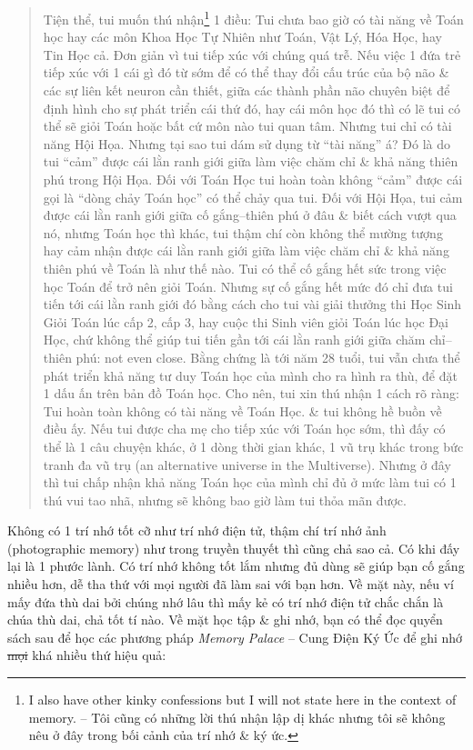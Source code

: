 \documentclass[12pt,oneside]{book}
\begin{document}
\begin{quote}
	Tiện thể, tui muốn thú nhận\footnote{I also have other kinky confessions but I will not state here in the context of memory. -- Tôi cũng có những lời thú nhận lập dị khác nhưng tôi sẽ không nêu ở đây trong bối cảnh của trí nhớ \& ký ức.} 1 điều: Tui chưa bao giờ có tài năng về Toán học hay các môn Khoa Học Tự Nhiên như Toán, Vật Lý, Hóa Học, hay Tin Học cả. Đơn giản vì tui tiếp xúc với chúng quá trễ. Nếu việc 1 đứa trẻ tiếp xúc với 1 cái gì đó từ sớm để có thể thay đổi cấu trúc của bộ não \& các sự liên kết neuron cần thiết, giữa các thành phần não chuyên biệt để định hình cho sự phát triển cái thứ đó, hay cái môn học đó thì có lẽ tui có thể sẽ giỏi Toán hoặc bất cứ môn nào tui quan tâm. Nhưng tui chỉ có tài năng Hội Họa. Nhưng tại sao tui dám sử dụng từ ``tài năng'' á? Đó là do tui ``cảm'' được cái lằn ranh giới giữa làm việc chăm chỉ \& khả năng thiên phú trong Hội Họa. Đối với Toán Học tui hoàn toàn không ``cảm'' được cái gọi là ``dòng chảy Toán học'' có thể chảy qua tui. Đối với Hội Họa, tui cảm được cái lằn ranh giới giữa cố gắng--thiên phú ở đâu \& biết cách vượt qua nó, nhưng Toán học thì khác, tui thậm chí còn không thể mường tượng hay cảm nhận được cái lằn ranh giới giữa làm việc chăm chỉ \& khả năng thiên phú về Toán là như thế nào. Tui có thể cố gắng hết sức trong việc học Toán để trở nên giỏi Toán. Nhưng sự cố gắng hết mức đó chỉ đưa tui tiến tới cái lằn ranh giới đó bằng cách cho tui vài giải thưởng thi Học Sinh Giỏi Toán lúc cấp 2, cấp 3, hay cuộc thi Sinh viên giỏi Toán lúc học Đại Học, chứ không thể giúp tui tiến gần tới cái lằn ranh giới giữa chăm chỉ--thiên phú: not even close. Bằng chứng là tới năm 28 tuổi, tui vẫn chưa thể phát triển khả năng tư duy Toán học của mình cho ra hình ra thù, để đặt 1 dấu ấn trên bản đồ Toán học. Cho nên, tui xin thú nhận 1 cách rõ ràng: Tui hoàn toàn không có tài năng về Toán Học. \& tui không hề buồn về điều ấy. Nếu tui được cha mẹ cho tiếp xúc với Toán học sớm, thì đấy có thể là 1 câu chuyện khác, ở 1 dòng thời gian khác, 1 vũ trụ khác trong bức tranh đa vũ trụ (an alternative universe in the Multiverse). Nhưng ở đây thì tui chấp nhận khả năng Toán học của mình chỉ đủ ở mức làm tui có 1 thú vui tao nhã, nhưng sẽ không bao giờ làm tui thỏa mãn được.
\end{quote}
Không có 1 trí nhớ tốt cỡ như trí nhớ điện tử, thậm chí trí nhớ ảnh (photographic memory) như trong truyền thuyết thì cũng chả sao cả. Có khi đấy lại là 1 phước lành. Có trí nhớ không tốt lắm nhưng đủ dùng sẽ giúp bạn cố gắng nhiều hơn, dễ tha thứ với mọi người đã làm sai với bạn hơn. Về mặt này, nếu ví mấy đứa thù dai bởi chúng nhớ lâu thì mấy kẻ có trí nhớ điện tử chắc chắn là chúa thù dai, chả tốt tí nào. Về mặt học tập \& ghi nhớ, bạn có thể đọc quyển sách sau để học các phương pháp {\it Memory Palace} -- Cung Điện Ký Ức để ghi nhớ \st{mọi} khá nhiều thứ hiệu quả:
\end{document}
